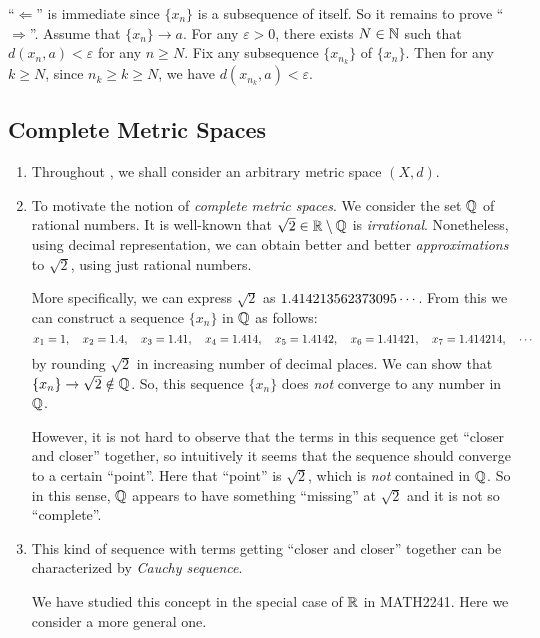 \begin{enumerate}
\begin{pf}
``\(\Leftarrow\)'' is immediate since \(\{x_n\}\) is a subsequence of itself.
So it remains to prove ``\(\Rightarrow\)''. Assume that \(\{x_n\}\to a\). For
any \(\varepsilon>0\), there exists \(N\in\mathbb{N}\) such that
\(d(x_n,a)<\varepsilon\) for any \(n\ge N\). Fix any subsequence
\(\{x_{n_k}\}\) of \(\{x_n\}\). Then for any \(k\ge N\), since \(n_k\ge k\ge
N\), we have \(d(x_{n_k},a)<\varepsilon\).
\end{pf}
\end{enumerate}
\subsection{Complete Metric Spaces}
\label{subsect:complete-ms}
\begin{enumerate}
\item Throughout , we shall consider an arbitrary
metric space \((X,d)\).

\item To motivate the notion of \emph{complete metric spaces}. We consider the
set \(\mathbb{Q}\) of rational numbers. It is well-known that
\(\sqrt{2}\in\mathbb{R}\setminus\mathbb{Q}\) is \emph{irrational}. Nonetheless, using decimal
representation, we can obtain better and better \emph{approximations} to
\(\sqrt{2}\), using just rational numbers.

More specifically, we can express \(\sqrt{2}\) as
\(\fpeval{sqrt(2)}\cdots\). From this we can construct a sequence \(\{x_n\}\)
in \(\mathbb{Q}\) as follows:
\[
x_1=\fpeval{round(sqrt(2),0)},\quad
x_2=\fpeval{round(sqrt(2),1)},\quad
x_3=\fpeval{round(sqrt(2),2)},\quad
x_4=\fpeval{round(sqrt(2),3)},\quad
x_5=\fpeval{round(sqrt(2),4)},\quad
x_6=\fpeval{round(sqrt(2),5)},\quad
x_7=\fpeval{round(sqrt(2),6)},\quad\cdots
\]
by rounding \(\sqrt{2}\) in increasing number of decimal places. We can show
that \(\{x_n\}\to\sqrt{2}\notin\mathbb{Q}\). So, this sequence \(\{x_n\}\) does
\emph{not} converge to any number in \(\mathbb{Q}\).

However, it is not hard to observe that the terms in this sequence get ``closer
and closer'' together, so intuitively it seems that the sequence should
converge to a certain ``point''. Here that ``point'' is \(\sqrt{2}\), which is
\emph{not} contained in \(\mathbb{Q}\). So in this sense, \(\mathbb{Q}\) appears to have
something ``missing'' at \(\sqrt{2}\) and it is not so ``complete''.

\item This kind of sequence with terms getting ``closer and closer'' together
can be characterized by \emph{Cauchy sequence}. \begin{note} We have studied
this concept in the special case of \(\mathbb{R}\) in MATH2241. Here we consider a more
general one. \end{note}


\end{enumerate}
